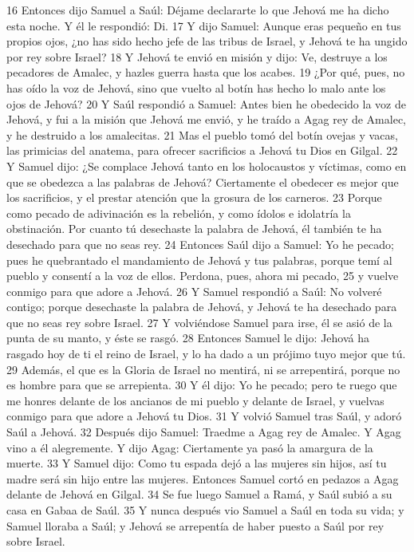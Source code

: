 16 Entonces dijo Samuel a Saúl: Déjame declararte lo que Jehová me ha dicho esta noche. Y él le respondió: Di.
17 Y dijo Samuel: Aunque eras pequeño en tus propios ojos, ¿no has sido hecho jefe de las tribus de Israel, y Jehová te ha ungido por rey sobre Israel?
18 Y Jehová te envió en misión y dijo: Ve, destruye a los pecadores de Amalec, y hazles guerra hasta que los acabes.
19 ¿Por qué, pues, no has oído la voz de Jehová, sino que vuelto al botín has hecho lo malo ante los ojos de Jehová?
20 Y Saúl respondió a Samuel: Antes bien he obedecido la voz de Jehová, y fui a la misión que Jehová me envió, y he traído a Agag rey de Amalec, y he destruido a los amalecitas.
21 Mas el pueblo tomó del botín ovejas y vacas, las primicias del anatema, para ofrecer sacrificios a Jehová tu Dios en Gilgal.
22 Y Samuel dijo: ¿Se complace Jehová tanto en los holocaustos y víctimas, como en que se obedezca a las palabras de Jehová? Ciertamente el obedecer es mejor que los sacrificios, y el prestar atención que la grosura de los carneros.
23 Porque como pecado de adivinación es la rebelión, y como ídolos e idolatría la obstinación. Por cuanto tú desechaste la palabra de Jehová, él también te ha desechado para que no seas rey.
24 Entonces Saúl dijo a Samuel: Yo he pecado; pues he quebrantado el mandamiento de Jehová y tus palabras, porque temí al pueblo y consentí a la voz de ellos. Perdona, pues, ahora mi pecado,
25 y vuelve conmigo para que adore a Jehová.
26 Y Samuel respondió a Saúl: No volveré contigo; porque desechaste la palabra de Jehová, y Jehová te ha desechado para que no seas rey sobre Israel.
27 Y volviéndose Samuel para irse, él se asió de la punta de su manto, y éste se rasgó.
28 Entonces Samuel le dijo: Jehová ha rasgado hoy de ti el reino de Israel, y lo ha dado a un prójimo tuyo mejor que tú.
29 Además, el que es la Gloria de Israel no mentirá, ni se arrepentirá, porque no es hombre para que se arrepienta.
30 Y él dijo: Yo he pecado; pero te ruego que me honres delante de los ancianos de mi pueblo y delante de Israel, y vuelvas conmigo para que adore a Jehová tu Dios.
31 Y volvió Samuel tras Saúl, y adoró Saúl a Jehová.
32 Después dijo Samuel: Traedme a Agag rey de Amalec. Y Agag vino a él alegremente. Y dijo Agag: Ciertamente ya pasó la amargura de la muerte.
33 Y Samuel dijo: Como tu espada dejó a las mujeres sin hijos, así tu madre será sin hijo entre las mujeres. Entonces Samuel cortó en pedazos a Agag delante de Jehová en Gilgal.
34 Se fue luego Samuel a Ramá, y Saúl subió a su casa en Gabaa de Saúl.
35 Y nunca después vio Samuel a Saúl en toda su vida; y Samuel lloraba a Saúl; y Jehová se arrepentía de haber puesto a Saúl por rey sobre Israel.

